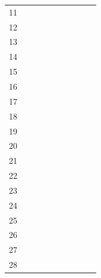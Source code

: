 \begin{table}
{\begin{tabular}{c | c | c | c | c | c | c | c | c | c}
			11 &   &   & \cellcolor{black} & \cellcolor{black} & \cellcolor{black} & \cellcolor{black} & \cellcolor{black} & \cellcolor{black} & \cellcolor{black} \\
			12 &   &   &   &   & \cellcolor{black} &   & \cellcolor{black} & \cellcolor{black} &   \\
			13 & \cellcolor{black} & \cellcolor{black} & \cellcolor{black} & \cellcolor{black} & \cellcolor{black} & \cellcolor{black} & \cellcolor{black} & \cellcolor{black} & \cellcolor{black} \\
			14 &   &   &   &   & \cellcolor{black} &   & \cellcolor{black} &   &   \\
			15 &   &   &   &   &   &   &   &   & \\
			16 &   & \cellcolor{black} & \cellcolor{black} & \cellcolor{black} & \cellcolor{black} &   & \cellcolor{black} &   & \cellcolor{black} \\
			17 &   &   &   &   &   &   &   &   & \\
			18 &   &   &   &   &   &   &   &   & \\
			19 & \cellcolor{black} & \cellcolor{black} & \cellcolor{black} & \cellcolor{black} & \cellcolor{black} & \cellcolor{black} & \cellcolor{black} & \cellcolor{black} & \cellcolor{black}\\
			20 &   &   & \cellcolor{black} & \cellcolor{black} & \cellcolor{black} & \cellcolor{black} & \cellcolor{black} & \cellcolor{black} & \cellcolor{black} \\
			21 &   &   &   &   & \cellcolor{black} &   & \cellcolor{black} &   & \\
			22 & \cellcolor{black} & \cellcolor{black} & \cellcolor{black} &   & \cellcolor{black} & \cellcolor{black} & \cellcolor{black} & \cellcolor{black} & \cellcolor{black} \\
			23 &   &   & \cellcolor{black} & \cellcolor{black} & \cellcolor{black} &   & \cellcolor{black} & \cellcolor{black} &  \\
			24 &   &   &   &   &   &   &   &   & \\
			25 &   &   & \cellcolor{black} & \cellcolor{black} & \cellcolor{black} &   & \cellcolor{black} &   & \cellcolor{black} \\
			26 &   &   &   &   &   &   &   &   & \\
			27 &   &   &   &   &   &   &   &   & \\
			28 & \cellcolor{black} & \cellcolor{black} & \cellcolor{black} & \cellcolor{black} & \cellcolor{black} & \cellcolor{black} & \cellcolor{black} & \cellcolor{black} & \cellcolor{black} \\

\end{tabular}}
\end{table}
